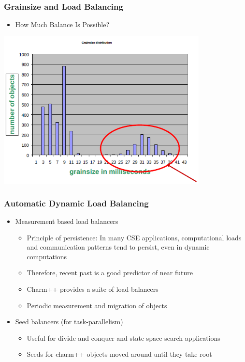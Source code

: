 \begin{frame}[fragile]
\frametitle{Grainsize and Load Balancing}
\begin{itemize}
\item[] How Much Balance Is Possible?
\end{itemize}
\begin{centering}
\includegraphics[width=0.8\textwidth]{figures/histogramGrains}
\end{centering}
\end{frame}

\begin{frame}[fragile]
\frametitle{Automatic Dynamic Load Balancing}
\begin{itemize}
\item Measurement based load balancers
\begin{itemize}
\item Principle of persistence: In many CSE applications, computational loads and communication patterns tend to persist, even in dynamic computations
\item Therefore, recent past is a good predictor of near future
\item Charm++ provides a suite of load-balancers 
\item Periodic measurement and migration of objects
\end{itemize}
\item Seed balancers (for task-parallelism)
\begin{itemize}
\item Useful for divide-and-conquer and state-space-search applications
\item Seeds for charm++ objects moved around until they take root
\end{itemize}
\end{itemize}
\end{frame}

